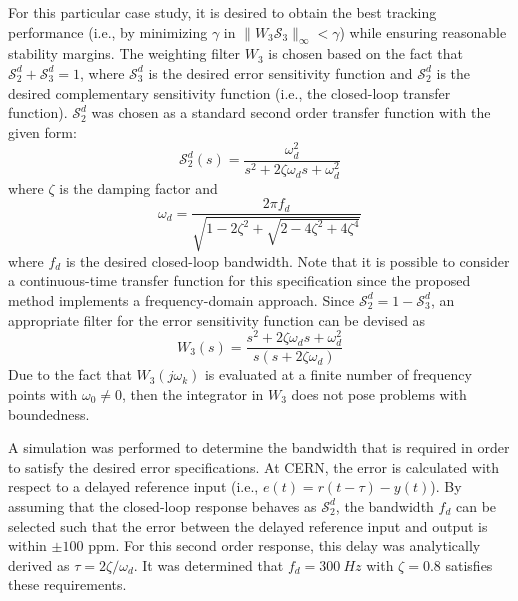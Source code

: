 \documentclass[journal]{IEEEtran}
\begin{document}
For this particular case study, it is desired to obtain the best tracking performance (i.e., by minimizing $\gamma$ in $\|W_3 \mathcal{S}_3 \|_{\infty} < \gamma$) while ensuring reasonable stability margins. The weighting filter $W_3$ is chosen based on the fact that $\mathcal{S}_2^d + \mathcal{S}_3^d = 1$, where $\mathcal{S}_3^d$ is the desired error sensitivity function and $\mathcal{S}_2^d$ is the desired complementary sensitivity function (i.e., the closed-loop transfer function). $\mathcal{S}_2^d$ was chosen as a standard second order transfer function  with the given form:
\begin{equation}
\mathcal{S}_2^d(s) = \frac{\omega_d^2}{s^2 + 2\zeta \omega_d s + \omega_d^2}
\end{equation}
where $\zeta$ is the damping factor and
\begin{equation*}
\omega_d = \frac{2 \pi f_d}{\sqrt{1-2\zeta^2 + \sqrt{2-4\zeta^2 + 4\zeta^4}}}
\end{equation*}
where $f_d$ is the desired closed-loop bandwidth. Note that it is possible to consider a continuous-time transfer function for this specification since the proposed method implements a frequency-domain approach. Since $\mathcal{S}_2^d = 1- \mathcal{S}_3^d$, an appropriate filter for the error sensitivity function can be devised as
\begin{equation}
W_3(s) = \frac{s^2 + 2\zeta \omega_d s + \omega_d^2}{s(s+2\zeta \omega_d)}
\end{equation}
Due to the fact that $W_3(j\omega_k)$ is evaluated at a finite number of frequency points with $\omega_0 \neq 0$, then the integrator in $W_3$ does not pose problems with boundedness.

A simulation was performed to determine the bandwidth that is required in order to satisfy the desired error specifications. At CERN, the error is calculated with respect to a delayed reference input (i.e., $e(t) = r(t-\tau) - y(t)$). By assuming that the closed-loop response behaves as $\mathcal{S}_2^d$, the bandwidth $f_d$ can be selected such that the error between the delayed reference input and output is within $\pm 100$ ppm. For this second order response, this delay was analytically derived as $\tau = 2\zeta/ \omega_d$. It was determined that $f_d = 300 \ Hz$ with $\zeta = 0.8$ satisfies these requirements. 
\end{document}

